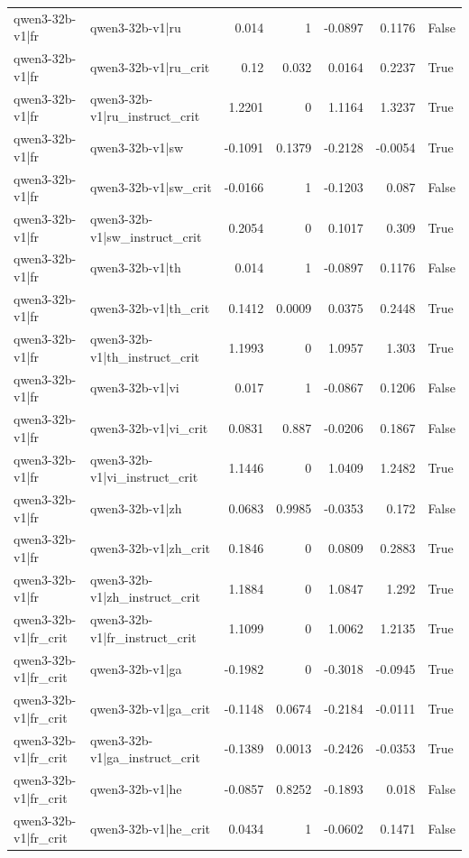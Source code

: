 \begin{table}
\begin{tabular}{l l r r r r l}
qwen3-32b-v1|fr & qwen3-32b-v1|ru & 0.014 & 1 & -0.0897 & 0.1176 & False \\
qwen3-32b-v1|fr & qwen3-32b-v1|ru_crit & 0.12 & 0.032 & 0.0164 & 0.2237 & True \\
qwen3-32b-v1|fr & qwen3-32b-v1|ru_instruct_crit & 1.2201 & 0 & 1.1164 & 1.3237 & True \\
qwen3-32b-v1|fr & qwen3-32b-v1|sw & -0.1091 & 0.1379 & -0.2128 & -0.0054 & True \\
qwen3-32b-v1|fr & qwen3-32b-v1|sw_crit & -0.0166 & 1 & -0.1203 & 0.087 & False \\
qwen3-32b-v1|fr & qwen3-32b-v1|sw_instruct_crit & 0.2054 & 0 & 0.1017 & 0.309 & True \\
qwen3-32b-v1|fr & qwen3-32b-v1|th & 0.014 & 1 & -0.0897 & 0.1176 & False \\
qwen3-32b-v1|fr & qwen3-32b-v1|th_crit & 0.1412 & 0.0009 & 0.0375 & 0.2448 & True \\
qwen3-32b-v1|fr & qwen3-32b-v1|th_instruct_crit & 1.1993 & 0 & 1.0957 & 1.303 & True \\
qwen3-32b-v1|fr & qwen3-32b-v1|vi & 0.017 & 1 & -0.0867 & 0.1206 & False \\
qwen3-32b-v1|fr & qwen3-32b-v1|vi_crit & 0.0831 & 0.887 & -0.0206 & 0.1867 & False \\
qwen3-32b-v1|fr & qwen3-32b-v1|vi_instruct_crit & 1.1446 & 0 & 1.0409 & 1.2482 & True \\
qwen3-32b-v1|fr & qwen3-32b-v1|zh & 0.0683 & 0.9985 & -0.0353 & 0.172 & False \\
qwen3-32b-v1|fr & qwen3-32b-v1|zh_crit & 0.1846 & 0 & 0.0809 & 0.2883 & True \\
qwen3-32b-v1|fr & qwen3-32b-v1|zh_instruct_crit & 1.1884 & 0 & 1.0847 & 1.292 & True \\
qwen3-32b-v1|fr_crit & qwen3-32b-v1|fr_instruct_crit & 1.1099 & 0 & 1.0062 & 1.2135 & True \\
qwen3-32b-v1|fr_crit & qwen3-32b-v1|ga & -0.1982 & 0 & -0.3018 & -0.0945 & True \\
qwen3-32b-v1|fr_crit & qwen3-32b-v1|ga_crit & -0.1148 & 0.0674 & -0.2184 & -0.0111 & True \\
qwen3-32b-v1|fr_crit & qwen3-32b-v1|ga_instruct_crit & -0.1389 & 0.0013 & -0.2426 & -0.0353 & True \\
qwen3-32b-v1|fr_crit & qwen3-32b-v1|he & -0.0857 & 0.8252 & -0.1893 & 0.018 & False \\
qwen3-32b-v1|fr_crit & qwen3-32b-v1|he_crit & 0.0434 & 1 & -0.0602 & 0.1471 & False \\

\end{tabular}
\end{table}
